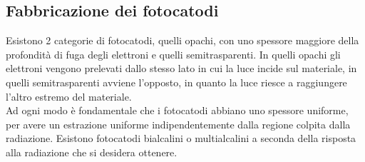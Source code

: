 \subsection{Fabbricazione dei fotocatodi}
Esistono 2 categorie di fotocatodi, quelli opachi, con uno spessore maggiore della profondit\`a di fuga degli elettroni e quelli semitrasparenti.
In quelli opachi gli elettroni vengono prelevati dallo stesso lato in cui la luce incide sul materiale, in quelli semitrasparenti avviene l'opposto, in quanto la luce
riesce a raggiungere l'altro estremo del materiale.\\
Ad ogni modo \`e fondamentale che i fotocatodi abbiano uno spessore uniforme, per avere un estrazione uniforme indipendentemente dalla regione colpita dalla radiazione.
Esistono fotocatodi bialcalini o multialcalini a seconda della risposta alla radiazione che si desidera ottenere.
